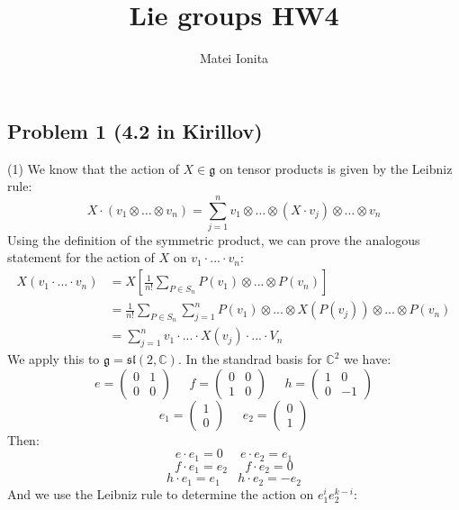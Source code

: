 \documentclass[12 pt]{article}
\title{Lie groups HW4}
\author{Matei Ionita}
\newcommand{\C}{\mathbb{C}}
\begin{document}
  \maketitle

\subsection*{Problem 1 (4.2 in Kirillov)}
(1) We know that the action of $X \in \mathfrak{g}$ on tensor products is given by the Leibniz rule:
\[            X \cdot (v_1 \otimes \dots \otimes v_n) = \sum_{j=1}^n v_1  \otimes \dots \otimes (X \cdot v_j) \otimes \dots \otimes v_n        \]
Using the definition of the symmetric product, we can prove the analogous statement for the action of $X$ on $v_1 \cdot ... \cdot v_n$:
\begin{align*}      
X (v_1 \cdot ... \cdot v_n) &= X \left[ \frac{1}{n!} \sum_{P \in S_n} P(v_1) \otimes ... \otimes P(v_n)  \right]  \\
 &= \frac{1}{n!} \sum_{P\in S_n} \sum_{j=1}^n P(v_1) \otimes ... \otimes X(P(v_j)) \otimes ... \otimes P(v_n) \\
&= \sum_{j=1}^n v_1 \cdot ... \cdot X(v_j) \cdot ... \cdot V_n
\end{align*}
We apply this to $\mathfrak{g} = \mathfrak{sl}(2,\C)$. In the standrad basis for $\C^2$ we have:
\[     e =  \left( \begin{array} {cc} 0 & 1 \\0 &0    \end{array} \right)  \;\;\;\;\;  f =  \left( \begin{array} {cc} 0 & 0 \\1 &0    \end{array} \right) \;\;\;\;\; h =  \left( \begin{array} {cc} 1 & 0 \\0 &-1    \end{array} \right)  \]
\[       e_1 =    \left( \begin{array} {c} 1 \\ 0   \end{array} \right)  \;\;\;\;\;  e_2 =    \left( \begin{array} {c} 0 \\ 1   \end{array} \right)  \]
Then:
\[          e \cdot e_1 = 0  \;\;\;\;\; e \cdot e_2 = e_1        \]
\[          f \cdot e_1 = e_2  \;\;\;\;\; f \cdot e_2 = 0        \]
\[          h \cdot e_1 = e_1  \;\;\;\;\; h \cdot e_2 = -e_2        \]
And we use the Leibniz rule to determine the action on $e_1^i e_2^{k-i}$:
\end{document}
